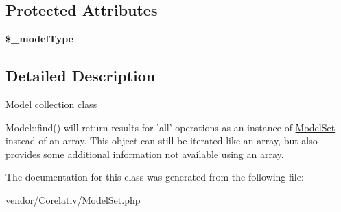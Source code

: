 \subsection*{Protected Attributes}
\begin{DoxyCompactItemize}
\item 
\hypertarget{classModelSet_a59522ff1f5e1bc4607d565c8edc282e5}{
{\bfseries \$\_\-modelType}}
\label{classModelSet_a59522ff1f5e1bc4607d565c8edc282e5}

\end{DoxyCompactItemize}


\subsection{Detailed Description}
\hyperlink{classModel}{Model} collection class

Model::find() will return results for 'all' operations as an instance of \hyperlink{classModelSet}{ModelSet} instead of an array. This object can still be iterated like an array, but also provides some additional information not available using an array. 

The documentation for this class was generated from the following file:\begin{DoxyCompactItemize}
\item 
vendor/Corelativ/ModelSet.php\end{DoxyCompactItemize}
